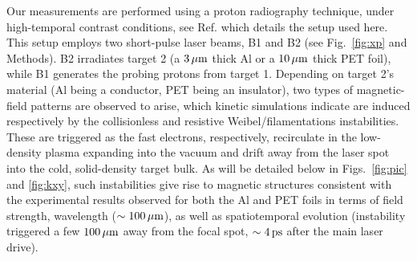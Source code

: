 \documentclass[aps,twocolumn,showpacs,superscriptaddress]{revtex4}
\begin{document}
Our measurements are performed using a proton radiography technique, under high-temporal contrast conditions, see Ref.  \cite{RSI_Albertazzi_2015} which details the setup used here. This setup employs two short-pulse laser beams, B1 and B2 (see Fig.~\ref{fig:xp} and Methods). B2 irradiates target 2 (a $3\,\rm \mu m$ thick Al or a $10\,\rm \mu m$ thick PET foil), while B1 generates the probing protons from target 1. Depending on target 2's material (Al being a conductor, PET being an insulator), two types of magnetic-field patterns are observed to arise, which kinetic simulations indicate are induced respectively by the collisionless and resistive Weibel/filamentations instabilities. These are triggered as the fast electrons, respectively, recirculate in the low-density plasma expanding into the vacuum and drift away from the laser spot into the cold, solid-density target bulk. As will be detailed below in Figs.~\ref{fig:pic} and \ref{fig:kxy}, such instabilities give rise to magnetic structures consistent with the experimental results observed for both the Al and PET foils in terms of field strength, wavelength ($\sim 100\,\rm \mu m$), as well as spatiotemporal evolution (instability triggered a few $100\,\rm \mu m$ away from the focal spot, $\sim 4\,\rm ps$ after the main laser drive).
%
\end{document}
